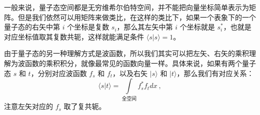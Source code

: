 一般来说，量子态空间都是无穷维希尔伯特空间，并不能把向量坐标简单表示为矩阵。但是我们依然可以用矩阵来做类比，在这样的类比下，如果一个表象下的一个量子态的右矢中第 $i$ 个坐标是复数 $s_i$，那么其左矢中第 $i$ 个坐标就是 $s_i^*$，也就是对应坐标值取其复数共轭，这样就能满足条件 $\langle s|s\rangle=1$。

由于量子态的另一种理解方式是波函数，所以我们其实可以把左矢、右矢的乘积理解为波函数的乘积积分，就像最常见的函数向量一样。具体来说，如果有两个量子态 $s$ 和 $t$，分别对应波函数 $f_s$ 和 $f_t$，以及右矢 $|s\rangle$ 和 $|t\rangle$，那么我们有对应关系：
\begin{equation}\langle s|t\rangle=\int\limits_{\text{全空间}}f_s^*f_tdx~,\end{equation}
注意左矢对应的 $f_s$ 取了复共轭。









